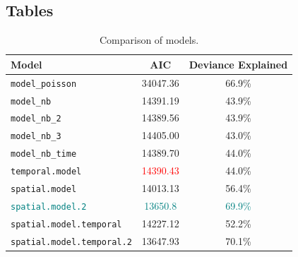 \subsection{Tables}

\begin{table}[H]
\centering
\begin{tabular}{l|c|c}
Model & AIC & Deviance Explained\\\hline
\texttt{model\_poisson} & 34047.36 & 66.9\%\\
\texttt{model\_nb} & 14391.19 & 43.9\%\\
\texttt{model\_nb\_2} & 14389.56 & 43.9\%\\
\texttt{model\_nb\_3} & 14405.00 & 43.0\%\\
\texttt{model\_nb\_time} & 14389.70 & 44.0\%\\
\texttt{temporal.model} & \textcolor{red}{14390.43} & 44.0\%\\
\texttt{spatial.model} & 14013.13 & 56.4\%\\
\textcolor{teal}{\texttt{spatial.model.2}} & \textcolor{teal}{13650.8} & \textcolor{teal}{69.9\%}\\
\texttt{spatial.model.temporal} & 14227.12 & 52.2\%\\
\texttt{spatial.model.temporal.2} & 13647.93 & 70.1\%
\end{tabular}
\caption{\label{tab:metrics}Comparison of models.}
\end{table}

